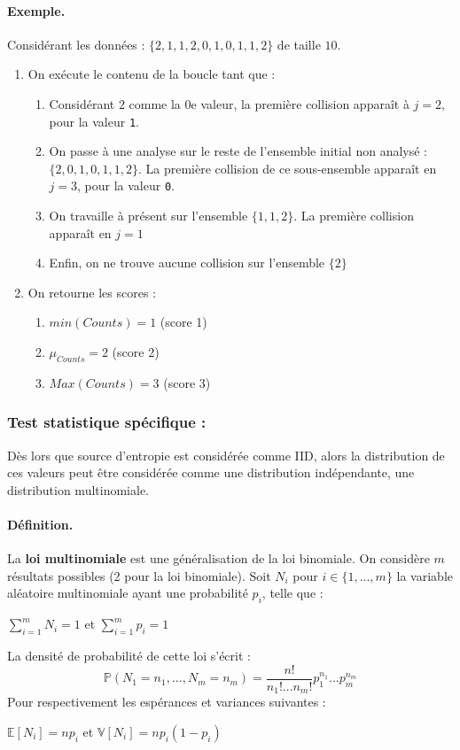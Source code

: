 \paragraph{Exemple.\\}
Considérant les données : $ \lbrace 2, 1, 1, 2, 0, 1, 0, 1, 1, 2 \rbrace$ de taille $10$.
\begin{enumerate}
\item On exécute le contenu de la boucle tant que : 
	\begin{enumerate}
	\item Considérant $2$ comme la $0$e valeur, la première collision apparaît à $j=2$, pour la valeur \texttt{1}.
	\item On passe à une analyse sur le reste de l'ensemble initial non analysé : $ \lbrace 2, 0, 1, 0, 1, 1, 2 \rbrace$. La première collision de ce sous-ensemble apparaît en $j=3$, pour la valeur \texttt{0}.
	\item On travaille à présent sur l'ensemble $ \lbrace 1, 1, 2 \rbrace$. La première collision apparaît en $j=1$
	\item Enfin, on ne trouve aucune collision sur l'ensemble $\lbrace 2 \rbrace $
	\end{enumerate}
\item On retourne les scores : 
	\begin{enumerate}
	\item $min(Counts) = 1$ (score 1)
	\item $\mu_{Counts} = 2$ (score 2)
	\item $Max(Counts) = 3$ (score 3)
	\end{enumerate}

\end{enumerate}

\subsubsection{Test statistique spécifique : \chidpdf}
Dès lors que source d'entropie est considérée comme IID, alors la distribution de ces valeurs peut être considérée comme une distribution indépendante, une distribution multinomiale.

\paragraph{Définition.\\}
La \textbf{loi multinomiale} est une généralisation de la loi binomiale. On considère $m$ résultats possibles (2 pour la loi binomiale). Soit $N_i$ pour $i \in \lbrace1,...,m\rbrace$ la variable aléatoire multinomiale ayant une probabilité $p_i$, telle que :
\begin{center}
$ \sum \limits_{i=1}^{m} N_i = 1$ et $\sum \limits_{i=1}^{m} p_i = 1$ 
\end{center}
La densité de probabilité de cette loi s'écrit : 
$$ \mathbb{P}(N_1=n_1, ..., N_m = n_m) = \frac{n!}{n_1! ... n_m!}p_1^{n_1}...p_m^{n_m}$$
Pour respectivement les espérances et variances suivantes :
\begin{center}
$ \mathbb{E}[N_i]=np_i$ et $\mathbb{V}[N_i]=np_i(1-p_i)$
\end{center}

